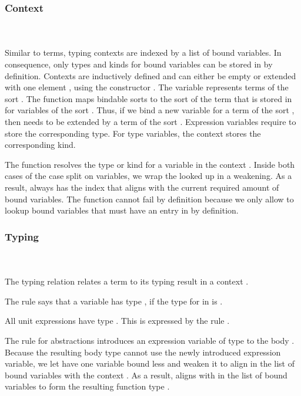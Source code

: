 \subsubsection{Context}\hfill\\\\
Similar to terms, typing contexts  are indexed by a list of bound variables.
In consequence, only types and kinds for bound variables can be stored in  by definition.
\FCtx
Contexts are inductively defined and can either be empty  or extended with one element , using the constructor   .
The variable  represents terms of the sort  . 
\noindent The function  maps bindable sorts  to the sort of the term that is stored in  for variables of the sort . Thus, if we bind a new variable for a term of the sort , then  needs to be extended by a term of the sort  .
\Fkind
Expression variables require  to store the corresponding type. 
For type variables, the context  stores the corresponding kind. 

\noindent The  function resolves the type or kind  for a variable in the context .
\Flookup
Inside both cases of the case split on variables, we wrap the looked up  in a weakening. 
As a result,  always has the index  that aligns with the current required amount of bound variables. 
The  function cannot fail by definition because we only allow to lookup bound variables that must have an entry in  by definition.

\subsubsection{Typing}\hfill\\\\
The typing relation    \Data{:}  relates a term  to its typing result  in a context .

\newpage

\FTyping
The rule  says that a variable   has type , if the type for  in  is . 

\noindent All unit expressions  have type . This is expressed by the rule .

\noindent The rule for abstractions  introduces an expression variable of type  to the body . 
Because the resulting body type  cannot use the newly introduced expression variable, we let  have one variable bound less and weaken it to align in the list of bound variables with the context   . 
As a result,  aligns with  in the list of bound variables to form the resulting function type   . 

